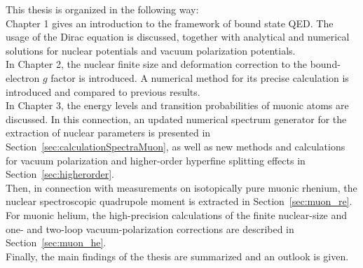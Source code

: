 This thesis is organized in the following way:\\
Chapter 1 gives an introduction to the framework of bound state QED. The usage of the Dirac equation is discussed, together with analytical and numerical solutions for nuclear potentials and vacuum polarization potentials.\\
In Chapter 2, the nuclear finite size and deformation correction to the bound-electron $g$ factor is introduced. A numerical method for its precise calculation is introduced and compared to previous results.\\
In Chapter 3, the energy levels and transition probabilities of muonic atoms are discussed. In this connection, an updated numerical spectrum generator for the extraction of nuclear parameters is presented in Section~\ref{sec:calculationSpectraMuon}, as well as new methods and calculations for vacuum polarization and higher-order hyperfine splitting effects in Section~\ref{sec:higherorder}. \\
Then, in connection with measurements on isotopically pure muonic rhenium, the nuclear spectroscopic quadrupole moment is extracted in Section~\ref{sec:muon_re}.\\
For muonic helium, the high-precision calculations of the finite nuclear-size and one- and two-loop vacuum-polarization corrections are described in Section~\ref{sec:muon_he}.\\
Finally, the main findings of the thesis are summarized and an outlook is given.




































